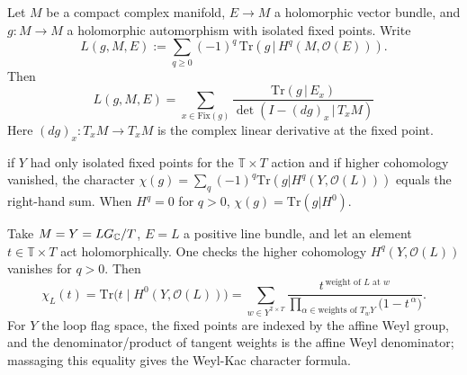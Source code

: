 \documentclass[12pt]{article}
\begin{document}
\begin{remark}
    Let $M$ be a compact complex manifold, $E\to M$ a holomorphic vector bundle, and $g:M\to M$ a holomorphic automorphism with isolated fixed points. Write
    \[
    L(g,M,E) := \sum_{q\ge 0}(-1)^q\,\mathrm{Tr}\left(g\,|\, H^q(M,\mathcal O(E))\right).
    \]
    Then
    \[
    L(g,M,E) = \sum_{x\in \mathrm{Fix}(g)} \frac{\mathrm{Tr}\left(g\,|\,E_x\right)}{\det\left( I - (dg)_x \,|\,T_xM\right)} \tag{HLF}
    \]
    Here $(dg)_x:T_xM\to T_xM$ is the complex linear derivative at the fixed point.

if $Y$ had only isolated fixed points for the $\mathbb{T}\times T$ action and if higher cohomology vanished, the character $\chi(g)=\sum_q (-1)^q\mathrm{Tr}(g|H^q(Y,\mathcal O(L)))$ equals the right-hand sum. When $H^q=0$ for $q>0$, $\chi(g)=\mathrm{Tr}(g|H^0)$.

Take $M=Y=LG_{\mathbb{C}}/T$, $E=L$ a positive line bundle, and let an element $t\in \mathbb T\times T$ act holomorphically. One checks the higher cohomology $H^q(Y,\mathcal O(L))$ vanishes for $q>0$. Then
\[
\chi_L(t)=\mathrm{Tr}\bigl(t\;|\;H^0(Y,\mathcal O(L))\bigr)
=\sum_{w\in Y^{\mathbb T\times T}}
\frac{t^{\,\text{weight of }L\text{ at }w}}{\prod_{\alpha\in \text{weights of }T_wY}\bigl(1-t^{\,\alpha}\bigr)}.
\]
For $Y$ the loop flag space, the fixed points are indexed by the affine Weyl group, and the denominator/product of tangent weights is the affine Weyl denominator; massaging this equality gives the Weyl-Kac character formula.

\end{remark}
\end{document}
